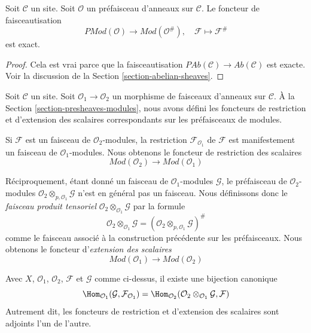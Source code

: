 \begin{lemma}
\label{lemma-sheafification-exact}
Soit $\mathcal{C}$ un site. Soit $\mathcal{O}$ un préfaisceau d'anneaux sur
$\mathcal{C}$. Le foncteur de faisceautisation
$$
\textit{PMod}(\mathcal{O}) \longrightarrow \textit{Mod}(\mathcal{O}^\#), \quad
\mathcal{F} \longmapsto \mathcal{F}^\#
$$
est exact.
\end{lemma}

\begin{proof}
Cela est vrai parce que la faisceautisation
$\textit{PAb}(\mathcal{C}) \to \textit{Ab}(\mathcal{C})$ est exacte. Voir la
discussion de la Section \ref{section-abelian-sheaves}.
\end{proof}

\noindent
Soit $\mathcal{C}$ un site. Soit
$\mathcal{O}_1 \to \mathcal{O}_2$ un morphisme de faisceaux d'anneaux sur
$\mathcal{C}$. À la Section \ref{section-presheaves-modules}, nous avons défini
les foncteurs de restriction et d'extension des scalaires correspondants sur
les préfaisceaux de modules.

\medskip\noindent
Si $\mathcal{F}$ est un faisceau de $\mathcal{O}_2$-modules, la restriction
$\mathcal{F}_{\mathcal{O}_1}$ de $\mathcal{F}$ est manifestement un faisceau de
$\mathcal{O}_1$-modules. Nous obtenons le foncteur de restriction des scalaires
$$
\textit{Mod}(\mathcal{O}_2)
\longrightarrow
\textit{Mod}(\mathcal{O}_1)
$$

\medskip\noindent
Réciproquement, étant donné un faisceau de $\mathcal{O}_1$-modules
$\mathcal{G}$, le préfaisceau de $\mathcal{O}_2$-modules
$\mathcal{O}_2 \otimes_{p, \mathcal{O}_1} \mathcal{G}$
n'est en général pas un faisceau. Nous définissons donc le {\it faisceau produit
tensoriel}
$\mathcal{O}_2 \otimes_{\mathcal{O}_1} \mathcal{G}$
par la formule
$$
\mathcal{O}_2 \otimes_{\mathcal{O}_1} \mathcal{G}
=
(\mathcal{O}_2 \otimes_{p, \mathcal{O}_1} \mathcal{G})^\#
$$
comme le faisceau associé à la construction précédente sur les préfaisceaux.
Nous obtenons le foncteur d'{\it extension des scalaires}
$$
\textit{Mod}(\mathcal{O}_1)
\longrightarrow
\textit{Mod}(\mathcal{O}_2)
$$

\begin{lemma}
\label{lemma-adjointness-tensor-restrict}
Avec $X$, $\mathcal{O}_1$, $\mathcal{O}_2$, $\mathcal{F}$ et $\mathcal{G}$
comme ci-dessus, il existe une bijection canonique
$$
\Hom_{\mathcal{O}_1}(\mathcal{G}, \mathcal{F}_{\mathcal{O}_1})
=
\Hom_{\mathcal{O}_2}(
\mathcal{O}_2 \otimes_{\mathcal{O}_1} \mathcal{G},
\mathcal{F}
)
$$
Autrement dit, les foncteurs de restriction et d'extension des scalaires sont
adjoints l'un de l'autre.
\end{lemma}

